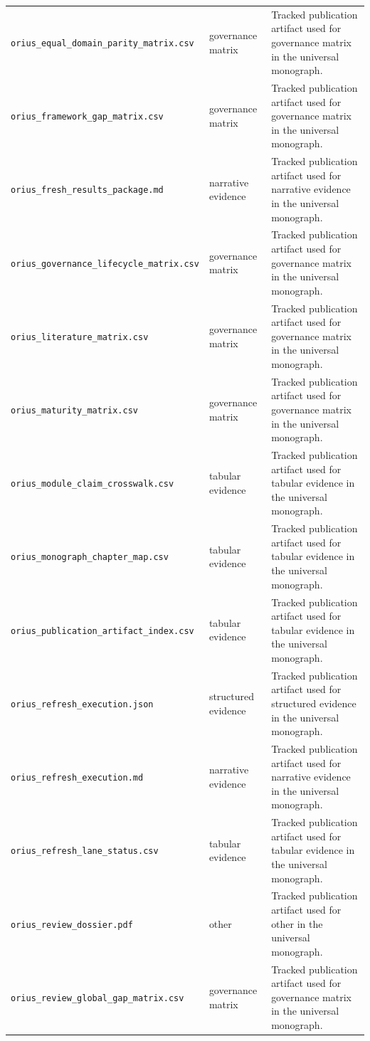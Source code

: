 \begin{longtable}{p{}p{}p{}}
\texttt{orius\_equal\_domain\_parity\_matrix.csv} & governance matrix & Tracked publication artifact used for governance matrix in the universal monograph.\\
\texttt{orius\_framework\_gap\_matrix.csv} & governance matrix & Tracked publication artifact used for governance matrix in the universal monograph.\\
\texttt{orius\_fresh\_results\_package.md} & narrative evidence & Tracked publication artifact used for narrative evidence in the universal monograph.\\
\texttt{orius\_governance\_lifecycle\_matrix.csv} & governance matrix & Tracked publication artifact used for governance matrix in the universal monograph.\\
\texttt{orius\_literature\_matrix.csv} & governance matrix & Tracked publication artifact used for governance matrix in the universal monograph.\\
\texttt{orius\_maturity\_matrix.csv} & governance matrix & Tracked publication artifact used for governance matrix in the universal monograph.\\
\texttt{orius\_module\_claim\_crosswalk.csv} & tabular evidence & Tracked publication artifact used for tabular evidence in the universal monograph.\\
\texttt{orius\_monograph\_chapter\_map.csv} & tabular evidence & Tracked publication artifact used for tabular evidence in the universal monograph.\\
\texttt{orius\_publication\_artifact\_index.csv} & tabular evidence & Tracked publication artifact used for tabular evidence in the universal monograph.\\
\texttt{orius\_refresh\_execution.json} & structured evidence & Tracked publication artifact used for structured evidence in the universal monograph.\\
\texttt{orius\_refresh\_execution.md} & narrative evidence & Tracked publication artifact used for narrative evidence in the universal monograph.\\
\texttt{orius\_refresh\_lane\_status.csv} & tabular evidence & Tracked publication artifact used for tabular evidence in the universal monograph.\\
\texttt{orius\_review\_dossier.pdf} & other & Tracked publication artifact used for other in the universal monograph.\\
\texttt{orius\_review\_global\_gap\_matrix.csv} & governance matrix & Tracked publication artifact used for governance matrix in the universal monograph.\\

\end{longtable}
